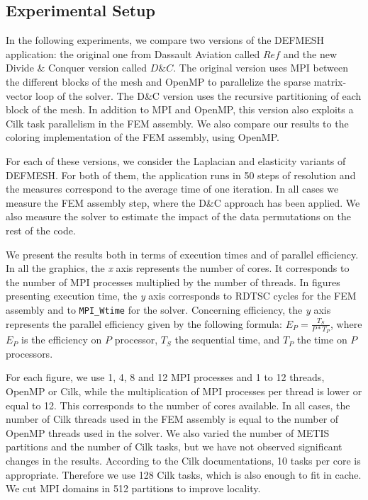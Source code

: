 \documentclass{IOS-Book-Article}
\begin{document}
\subsection{Experimental Setup}
In the following experiments, we compare two versions of the DEFMESH application: the original one from Dassault Aviation called $Ref$ and the new Divide \& Conquer version called $D\&C$.
The original version uses MPI between the different blocks of the mesh and OpenMP to parallelize the sparse matrix-vector loop of the solver.
The D\&C version uses the recursive partitioning of each block of the mesh.
In addition to MPI and OpenMP, this version also exploits a Cilk task parallelism in the FEM assembly.
We also compare our results to the coloring implementation of the FEM assembly, using OpenMP.

For each of these versions, we consider the Laplacian and elasticity variants of DEFMESH.
For both of them, the application runs in 50 steps of resolution and the measures correspond to the average time of one iteration.
In all cases we measure the FEM assembly step, where the D\&C approach has been applied.
We also measure the solver to estimate the impact of the data permutations on the rest of the code.

We present the results both in terms of execution times and of parallel efficiency.
In all the graphics, the \emph{x} axis represents the number of cores. It corresponds to the number of MPI processes multiplied by the number of threads.
In figures presenting execution time, the \emph{y} axis corresponds to RDTSC cycles for the FEM assembly and to \texttt{MPI\_Wtime} for the solver.
Concerning efficiency, the \emph{y} axis represents the parallel efficiency given by the following formula:
$E_{P} = \frac{T_{S}}{P*T_{P}}$, where $E_{P}$ is the efficiency on $P$ processor, $T_{S}$ the sequential time, and $T_{P}$ the time on $P$ processors.

For each figure, we use 1, 4, 8 and 12 MPI processes and 1 to 12 threads, OpenMP or Cilk, while the multiplication of MPI processes per thread is lower or equal to 12.
This corresponds to the number of cores available. In all cases, the number of Cilk threads used in the FEM assembly is equal to the number of OpenMP threads used in the solver.
We also varied the number of METIS partitions and the number of Cilk tasks, but we have not observed significant changes in the results.
According to the Cilk documentations, 10 tasks per core is appropriate. Therefore we use 128 Cilk tasks, which is also enough to fit in cache.
We cut MPI domains in 512 partitions to improve locality.
\end{document}
